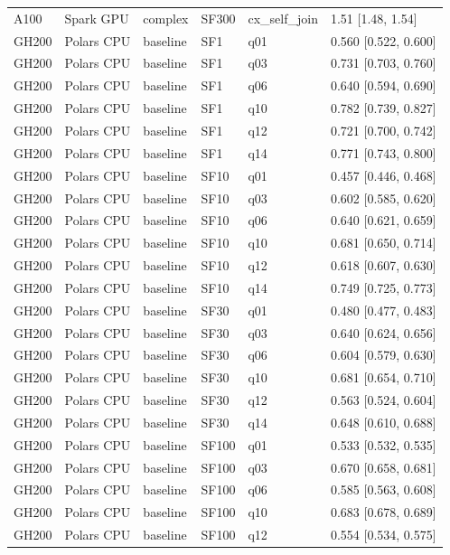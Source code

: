 \begin{longtable}{llllll}
A100 & Spark GPU & complex & SF300 & cx\_self\_join & 1.51 [1.48, 1.54] \\
GH200 & Polars CPU & baseline & SF1 & q01 & 0.560 [0.522, 0.600] \\
GH200 & Polars CPU & baseline & SF1 & q03 & 0.731 [0.703, 0.760] \\
GH200 & Polars CPU & baseline & SF1 & q06 & 0.640 [0.594, 0.690] \\
GH200 & Polars CPU & baseline & SF1 & q10 & 0.782 [0.739, 0.827] \\
GH200 & Polars CPU & baseline & SF1 & q12 & 0.721 [0.700, 0.742] \\
GH200 & Polars CPU & baseline & SF1 & q14 & 0.771 [0.743, 0.800] \\
GH200 & Polars CPU & baseline & SF10 & q01 & 0.457 [0.446, 0.468] \\
GH200 & Polars CPU & baseline & SF10 & q03 & 0.602 [0.585, 0.620] \\
GH200 & Polars CPU & baseline & SF10 & q06 & 0.640 [0.621, 0.659] \\
GH200 & Polars CPU & baseline & SF10 & q10 & 0.681 [0.650, 0.714] \\
GH200 & Polars CPU & baseline & SF10 & q12 & 0.618 [0.607, 0.630] \\
GH200 & Polars CPU & baseline & SF10 & q14 & 0.749 [0.725, 0.773] \\
GH200 & Polars CPU & baseline & SF30 & q01 & 0.480 [0.477, 0.483] \\
GH200 & Polars CPU & baseline & SF30 & q03 & 0.640 [0.624, 0.656] \\
GH200 & Polars CPU & baseline & SF30 & q06 & 0.604 [0.579, 0.630] \\
GH200 & Polars CPU & baseline & SF30 & q10 & 0.681 [0.654, 0.710] \\
GH200 & Polars CPU & baseline & SF30 & q12 & 0.563 [0.524, 0.604] \\
GH200 & Polars CPU & baseline & SF30 & q14 & 0.648 [0.610, 0.688] \\
GH200 & Polars CPU & baseline & SF100 & q01 & 0.533 [0.532, 0.535] \\
GH200 & Polars CPU & baseline & SF100 & q03 & 0.670 [0.658, 0.681] \\
GH200 & Polars CPU & baseline & SF100 & q06 & 0.585 [0.563, 0.608] \\
GH200 & Polars CPU & baseline & SF100 & q10 & 0.683 [0.678, 0.689] \\
GH200 & Polars CPU & baseline & SF100 & q12 & 0.554 [0.534, 0.575] \\

\end{longtable}
